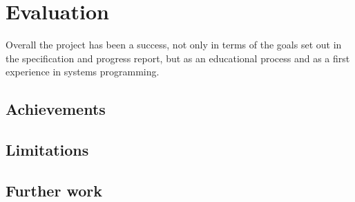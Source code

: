
\section{Evaluation}
    \label{sec:evaluation}
    Overall the project has been a success, not only in terms of the goals set
    out in the specification and progress report, but as an educational
    process and as a first experience in systems programming.
\subsection{Achievements}
\subsection{Limitations}
\subsection{Further work}
